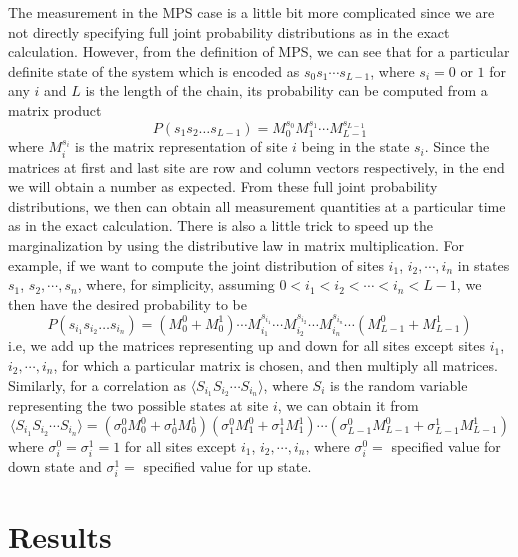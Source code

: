 \documentclass[english]{article}
\begin{document}
The measurement in the MPS case is a little bit more complicated since we are not directly specifying full joint probability distributions as in the exact calculation. However, from the definition of MPS, we can see that for a particular definite state of the system which is encoded as $s_0s_1\cdots s_{L-1}$, where $s_i=0$ or $1$ for any $i$ and $L$ is the length of the chain, its probability can be computed from a matrix product 
\begin{displaymath}
P(s_1s_2\dots s_{L-1}) = M_0^{s_0}M_1^{s_1}\cdots M_{L-1}^{s_{L-1}}
\end{displaymath} 
where $M_i^{s_i}$ is the matrix representation of site $i$ being in the state $s_i$. Since the matrices at first and last site are row and column vectors respectively, in the end we will obtain a number as expected. From these full joint probability distributions, we then can obtain all measurement quantities at a particular time as in the exact calculation. There is also a little trick to speed up the marginalization by using the distributive law in matrix multiplication. For example, if we want to compute the joint distribution of sites $i_1$, $i_2,\cdots,i_n$ in states $s_1$, $s_2,\cdots,s_n$, where, for simplicity, assuming $0<i_1<i_2<\cdots<i_n<L-1$, we then have the desired probability to be
\begin{displaymath}
P(s_{i_1}s_{i_2}\dots s_{i_n}) = (M_0^{0} + M_0^{1})\cdots M_{i_1}^{s_{i_1}}\cdots M_{i_2}^{s_{i_2}} \cdots M_{i_n}^{s_{i_n}} \cdots (M_{L-1}^{0} + M_{L-1}^{1})
\end{displaymath}
i.e, we add up the matrices representing up and down for all sites except sites $i_1$, $i_2,\cdots,i_n$, for which a particular matrix is chosen, and then multiply all matrices. Similarly, for a correlation as $\langle S_{i_1} S_{i_2} \cdots S_{i_n} \rangle$, where $S_i$ is the random variable representing the two possible states at site $i$, we can obtain it from
\begin{displaymath}
\langle S_{i_1} S_{i_2} \cdots S_{i_n} \rangle = (\sigma_0^0 M_0^0 + \sigma_0^1M_0^1)(\sigma_1^0M_1^0 + \sigma_1^1M_1^1)\cdots (\sigma_{L-1}^0M_{L-1}^0 + \sigma_{L-1}^1M^1_{L-1})
\end{displaymath}
where $\sigma_i^0=\sigma_i^1=1$ for all sites except $i_1$, $i_2,\cdots,i_n$, where $\sigma_i^0=$ specified value for down state and $\sigma_i^1=$ specified value for up state. 
\vspace{3mm}

\section{Results}
\end{document}
